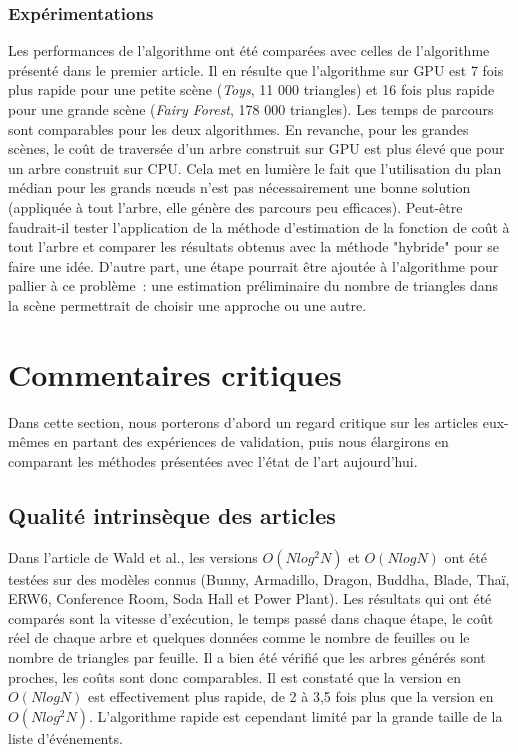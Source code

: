 \documentclass[a4paper]{article}
\begin{document}
\subsubsection{Expérimentations}
Les performances de l'algorithme ont été comparées avec celles de l'algorithme présenté dans le premier article. Il en résulte que l'algorithme sur GPU est 7 fois plus rapide pour une petite scène (\textit{Toys}, 11 000 triangles) et 16 fois plus rapide pour une grande scène (\textit{Fairy Forest}, 178 000 triangles). Les temps de parcours sont comparables pour les deux algorithmes. En revanche, pour les grandes scènes, le coût de traversée d'un arbre construit sur GPU est plus élevé que pour un arbre construit sur CPU. Cela met en lumière le fait que l'utilisation du plan médian pour les grands nœuds n'est pas nécessairement une bonne solution (appliquée à tout l'arbre, elle génère des parcours peu efficaces). Peut-être faudrait-il tester l'application de la méthode d'estimation de la fonction de coût à tout l'arbre et comparer les résultats obtenus avec la méthode "hybride" pour se faire une idée. D'autre part, une étape pourrait être ajoutée à l'algorithme pour pallier à ce problème~: une estimation préliminaire du nombre de triangles dans la scène permettrait de choisir une approche ou une autre.

\section{Commentaires critiques}

Dans cette section, nous porterons d'abord un regard critique sur les articles eux-mêmes en partant des expériences de validation, puis nous élargirons en comparant les méthodes présentées avec l'état de l'art aujourd'hui.

\subsection{Qualité intrinsèque des articles}

Dans l'article de Wald et al., les versions $O(Nlog^2N)$ et $O(NlogN)$ ont été testées sur des modèles connus (Bunny, Armadillo, Dragon, Buddha, Blade, Thaï, ERW6, Conference Room, Soda Hall et Power Plant). Les résultats qui ont été comparés sont la vitesse d'exécution, le temps passé dans chaque étape, le coût réel de chaque arbre et quelques données comme le nombre de feuilles ou le nombre de triangles par feuille. Il a bien été vérifié que les arbres générés sont proches, les coûts sont donc comparables. Il est constaté que la version en $O(NlogN)$ est effectivement plus rapide, de 2 à 3,5 fois plus que la version en $O(Nlog^2N)$. L'algorithme rapide est cependant limité par la grande taille de la liste d'événements.
\end{document}
